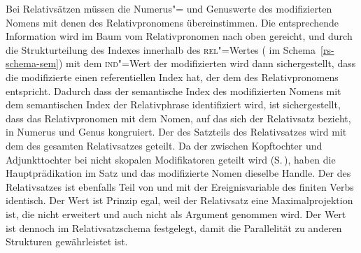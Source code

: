 \noindent
%
Bei Relativsätzen müssen die Numerus"= und Genuswerte des modifizierten Nomens mit denen des Relativpronomens
übereinstimmen. Die entsprechende Information wird im Baum vom Relativpronomen nach oben gereicht, und durch die Strukturteilung
des Indexes innerhalb des \textsc{rel}"=Wertes ( im Schema~\ref{rs-schema-sem}) mit dem \textsc{ind}"=Wert der
modifizierten \nbar wird dann sichergestellt, dass die modifizierte \nbar einen referentiellen Index
hat, der dem des Relativpronomens entspricht. Dadurch dass der semantische 
Index des modifizierten Nomens  mit dem semantischen Index der Relativphrase identifiziert wird,
ist sichergestellt, dass das Relativpronomen mit dem Nomen, auf das sich der Relativsatz bezieht, in
Numerus und Genus kongruiert. Der \ltopw des Satzteils des Relativsatzes wird mit dem \ltopw des
gesamten Relativsatzes  geteilt. Da der \ltopw zwischen Kopftochter und Adjunkttochter bei
nicht skopalen Modifikatoren geteilt wird
(S.\,\pageref{Semantikprinzip-nicht-skopaleTochter-LTOP}), haben die Hauptprädikation im Satz und
das modifizierte Nomen dieselbe Handle. Der \indw des Relativsatzes ist ebenfalls Teil von \cont und
mit der Ereignisvariable des finiten Verbs identisch. Der Wert ist Prinzip egal, weil der
Relativsatz eine Maximalprojektion ist, die nicht erweitert und auch nicht 
als Argument genommen wird. Der Wert ist dennoch im Relativsatzschema festgelegt, damit die
Parallelität zu anderen Strukturen gewährleistet ist.

